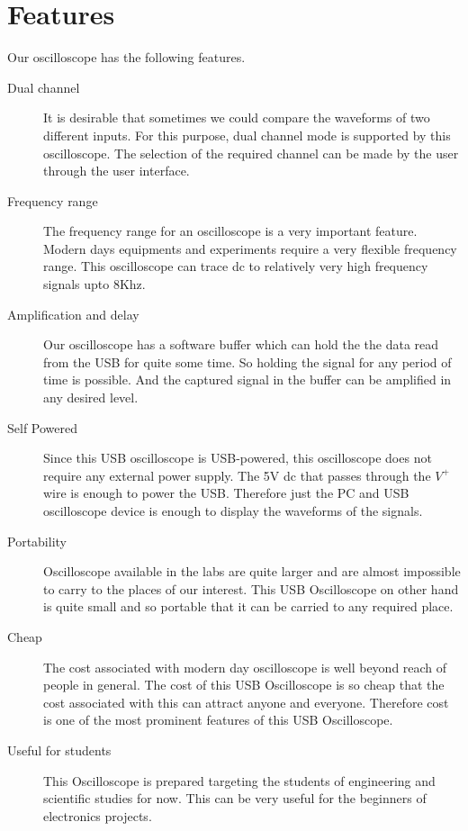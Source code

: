 \documentclass[12pt,a4paper]{article}
\begin{document}
\section{Features}
Our oscilloscope has the following features.
\begin{description}

\item[Dual channel] It is desirable that sometimes we could compare the waveforms of two different inputs. For this purpose, dual channel mode is supported by this oscilloscope. The selection of the required channel can be made by the user through the user interface.
\item[Frequency range]	The frequency range for an oscilloscope is a very important feature. Modern days equipments and experiments require a very flexible frequency range. This oscilloscope can trace dc to relatively very high frequency signals upto 8Khz.
\item[Amplification and delay] Our oscilloscope has a software buffer which can hold the the data read from the USB for quite some time. So holding the signal for any period of time is possible. And the captured signal in the buffer can be amplified in any desired level.
	 
\item[Self Powered]	Since this USB oscilloscope is USB-powered, this oscilloscope does not require any external power supply. The 5V dc that passes through the $V^+$ wire is enough to power the USB. Therefore just the PC and USB oscilloscope device is enough to display the waveforms of the signals.
\item[Portability]
	Oscilloscope available in the labs are quite larger and are almost impossible to carry to the places of our interest. This USB Oscilloscope on other hand is quite small and so portable that it can be carried to any required place.
\item[Cheap]
	The cost associated with modern day oscilloscope is well beyond reach of people in general. The cost of this USB Oscilloscope is so cheap that the cost associated with this can attract anyone and everyone. Therefore cost is one of the most prominent features of this USB Oscilloscope.
	
\item[Useful for students]
	This Oscilloscope is prepared targeting the students of engineering and scientific studies for now. This can be very useful for the beginners of electronics projects.


\end{description}
\end{document}
